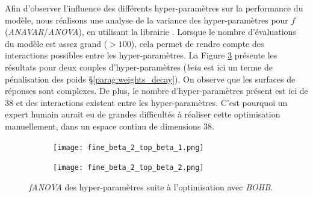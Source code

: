 % 
% 
% 

Afin d'observer l'influence des différents hyper-paramètres sur la performance du modèle, nous réalisons une analyse de la variance des hyper-paramètres pour $f$ (\textit{ANAVAR}/\textit{ANOVA}), en utilisant la librairie \citeauthor{hutter_efficient_2014} \cite{hutter_efficient_2014}.
Lorsque le nombre d'évaluations du modèle est assez grand ($> 100$), cela permet de rendre compte des interactions possibles entre les hyper-paramètres.
La Figure \ref{fig:fanova} présente les résultats pour deux couples d'hyper-paramètres (\textit{beta} est ici un terme de pénalisation des poids §\ref{parag:weights_decay}).
On observe que les surfaces de réponses sont complexes.
De plus, le nombre d'hyper-paramètres présent est ici de 38 et des interactions existent entre les hyper-paramètres.
C'est pourquoi un expert humain aurait eu de grandes difficultés à réaliser cette optimisation manuellement, dans un espace continu de dimensions 38.

\begin{figure}[tbp]
	\centering
	\begin{subfigure}{.49\textwidth}
		\centering
		\texttt{[image: fine\_beta\_2\_top\_beta\_1.png]}
		\label{fig:fanova_a}
	\end{subfigure}\hfill%
	\begin{subfigure}{.49\textwidth}
		\centering
		\texttt{[image: fine\_beta\_2\_top\_beta\_2.png]}
		\label{fig:fanova_b}
	\end{subfigure}
	\caption{\textit{fANOVA} des hyper-paramètres suite à l'optimisation avec \textit{BOHB}.}
	\label{fig:fanova}
\end{figure}

